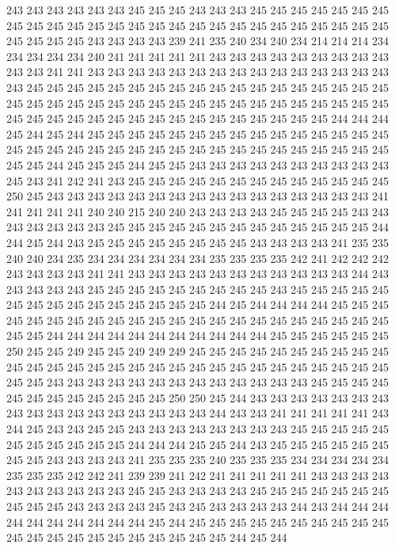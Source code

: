 243 243 243 243 243 243 245 245 245 243 243 243 245 245 245 245 245 245 245 245
245 245 245 245 245 245 245 245 245 245 245 245 245 245 245 245 245 245 245 245
245 245 243 243 243 243 239 241 235 240 234 240 234 214 214 214 234 234 234 234
234 240 241 241 241 241 241 243 243 243 243 243 243 243 243 243 243 243 241 241
243 243 243 243 243 243 243 243 243 243 243 243 243 243 243 243 245 245 245 245
245 245 245 245 245 245 245 245 245 245 245 245 245 245 245 245 245 245 245 245
245 245 245 245 245 245 245 245 245 245 245 245 245 245 245 245 245 245 245 245
245 245 245 245 245 245 245 245 245 244 244 244 245 244 245 244 245 245 245 245
245 245 245 245 245 245 245 245 245 245 245 245 245 245 245 245 245 245 245 245
245 245 245 245 245 245 245 245 245 245 245 245 244 245 245 245 244 245 245 243
243 243 243 243 243 243 243 243 243 245 243 241 242 241 243 245 245 245 245 245
245 245 245 245 245 245 245 245 250 245 243 243 243 243 243 243 243 243 243 243
243 243 243 243 243 243 241 241 241 241 241 240 240 215 240 240 243 243 243 243
245 245 245 245 243 243 243 243 243 243 243 245 245 245 245 245 245 245 245 245
245 245 245 245 244 244 245 244 243 245 245 245 245 245 245 245 245 243 243 243
243 241 235 235 240 240 234 235 234 234 234 234 234 234 235 235 235 235 242 241
242 242 242 243 243 243 243 241 241 243 243 243 243 243 243 243 243 243 243 243
244 243 243 243 243 243 245 245 245 245 245 245 245 245 245 243 245 245 245 245
245 245 245 245 245 245 245 245 245 245 245 244 245 244 244 244 244 245 245 245
245 245 245 245 245 245 245 245 245 245 245 245 245 245 245 245 245 245 245 245
245 244 244 244 244 244 244 244 244 244 244 244 245 245 245 245 245 245 250 245
245 249 245 245 249 249 249 245 245 245 245 245 245 245 245 245 245 245 245 245
245 245 245 245 245 245 245 245 245 245 245 245 245 245 245 245 245 245 243 243
243 243 243 243 243 243 243 243 243 243 243 245 245 245 245 245 245 245 245 245
245 245 245 250 250 245 244 243 243 243 243 243 243 243 243 243 243 243 243 243
243 243 243 243 244 243 243 241 241 241 241 241 243 244 245 243 243 245 245 243
243 243 243 243 243 243 243 245 245 245 245 245 245 245 245 245 245 245 244 244
244 245 245 244 243 245 245 245 245 245 245 245 245 243 243 243 243 241 235 235
235 240 235 235 235 234 234 234 234 234 235 235 235 242 242 241 239 239 241 242
241 241 241 241 241 243 243 243 243 243 243 243 243 243 243 245 245 243 243 243
243 245 245 245 245 245 245 245 245 245 245 243 243 243 243 245 243 245 243 243
243 243 244 243 244 244 244 244 244 244 244 244 244 244 245 244 245 245 245 245
245 245 245 245 245 245 245 245 245 245 245 245 245 245 245 245 245 244 245 244
